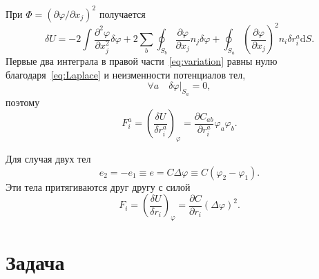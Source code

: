 \documentclass{article}
\theoremstyle{plain}
\newcommand{\dd}{\mathrm{d}}
\newcommand{\pder}[2][]{\frac{\partial#1}{\partial#2}}
\newcommand{\pderdual}[2][]{\frac{\partial^2#1}{\partial#2^2}}
\newcommand{\Pder}[2][]{\partial#1/\partial#2}
\newcommand{\eqdef}{\equiv}
\begin{document}
При \(\Phi=(\Pder[\varphi]{x_j})^2\) получается
\begin{equation}\label{eq:variation}
    \delta U =
    - 2\int \pderdual[\varphi]{x_j} \delta\varphi
    + 2\sum_b \oint_{S_b} \pder[\varphi]{x_j} n_j\delta\varphi
    + \oint_{S_a} \left(\pder[\varphi]{x_j}\right)^2 n_i \delta r^a_i \dd{S}.
\end{equation}
Первые два интеграла в правой части~\eqref{eq:variation} равны нулю
благодаря~\eqref{eq:Laplace} и неизменности потенциалов тел,
\begin{equation}\label{eq:delta_phi}
    \forall a \quad \delta\varphi|_{S_a} = 0,
\end{equation}
поэтому
\begin{equation}\label{eq:force_n}
    F^a_i = \left(\frac{\delta U}{\delta r^a_i}\right)_\varphi = \pder[C_{ab}]{r^a_i} \varphi_a \varphi_b.
\end{equation}

Для случая двух тел
\begin{equation}\label{eq:capacity}
    e_2 = -e_1 \eqdef e = C\Delta\varphi \eqdef C(\varphi_2 - \varphi_1).
\end{equation}
Эти тела притягиваются друг другу с силой
\begin{equation}\label{eq:force2}
    F_i = \left(\frac{\delta U}{\delta r_i}\right)_\varphi = \pder[C]{r_i}(\Delta\varphi)^2.
\end{equation}

\section{Задача}
\end{document}
